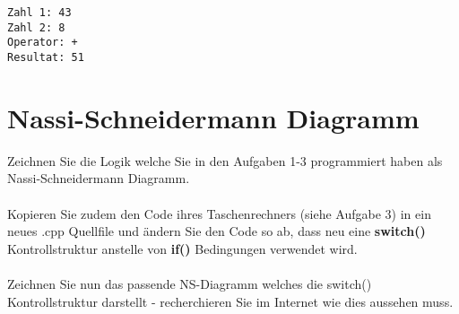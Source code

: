 \documentclass[a4paper,10pt]{article}
\begin{document}
\verb|Zahl 1: 43|\\
\verb|Zahl 2: 8|\\
\verb|Operator: +|\\
\verb|Resultat: 51|

\section{Nassi-Schneidermann Diagramm}
Zeichnen Sie die Logik welche Sie in den Aufgaben 1-3 programmiert haben als Nassi-Schneidermann Diagramm. \\ 
\\
Kopieren Sie zudem den Code ihres Taschenrechners (siehe Aufgabe 3) in ein neues .cpp Quellfile und \"andern Sie den Code so ab, dass neu eine \textbf{switch()} Kontrollstruktur anstelle von \textbf{if()} Bedingungen verwendet wird. \\
\\
Zeichnen Sie nun das passende NS-Diagramm welches die switch() Kontrollstruktur darstellt - recherchieren Sie im Internet wie dies aussehen muss.
\end{document}
